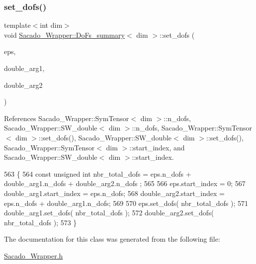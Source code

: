 \subsubsection{\texorpdfstring{set\+\_\+dofs()}{set\_dofs()}\hspace{0.1cm}{\footnotesize\ttfamily [3/3]}}
{\footnotesize\ttfamily template$<$int dim$>$ \\
void \hyperlink{classSacado__Wrapper_1_1DoFs__summary}{Sacado\+\_\+\+Wrapper\+::\+Do\+Fs\+\_\+summary}$<$ dim $>$\+::set\+\_\+dofs (\begin{DoxyParamCaption}\item[{\hyperlink{classSacado__Wrapper_1_1SymTensor}{Sym\+Tensor}$<$ dim $>$ \&}]{eps,  }\item[{\hyperlink{classSacado__Wrapper_1_1SW__double}{S\+W\+\_\+double}$<$ dim $>$ \&}]{double\+\_\+arg1,  }\item[{\hyperlink{classSacado__Wrapper_1_1SW__double}{S\+W\+\_\+double}$<$ dim $>$ \&}]{double\+\_\+arg2 }\end{DoxyParamCaption})}



References Sacado\+\_\+\+Wrapper\+::\+Sym\+Tensor$<$ dim $>$\+::n\+\_\+dofs, Sacado\+\_\+\+Wrapper\+::\+S\+W\+\_\+double$<$ dim $>$\+::n\+\_\+dofs, Sacado\+\_\+\+Wrapper\+::\+Sym\+Tensor$<$ dim $>$\+::set\+\_\+dofs(), Sacado\+\_\+\+Wrapper\+::\+S\+W\+\_\+double$<$ dim $>$\+::set\+\_\+dofs(), Sacado\+\_\+\+Wrapper\+::\+Sym\+Tensor$<$ dim $>$\+::start\+\_\+index, and Sacado\+\_\+\+Wrapper\+::\+S\+W\+\_\+double$<$ dim $>$\+::start\+\_\+index.


\begin{DoxyCode}
563     \{
564         \textcolor{keyword}{const} \textcolor{keywordtype}{unsigned} \textcolor{keywordtype}{int} nbr\_total\_dofs = eps.n\_dofs + double\_arg1.n\_dofs + double\_arg2.n\_dofs ;
565 
566         eps.start\_index = 0;
567         double\_arg1.start\_index = eps.n\_dofs;
568         double\_arg2.start\_index = eps.n\_dofs + double\_arg1.n\_dofs;
569 
570         eps.set\_dofs( nbr\_total\_dofs );
571         double\_arg1.set\_dofs( nbr\_total\_dofs );
572         double\_arg2.set\_dofs( nbr\_total\_dofs );
573     \}
\end{DoxyCode}


The documentation for this class was generated from the following file\+:\begin{DoxyCompactItemize}
\item 
\hyperlink{Sacado__Wrapper_8h}{Sacado\+\_\+\+Wrapper.\+h}\end{DoxyCompactItemize}
